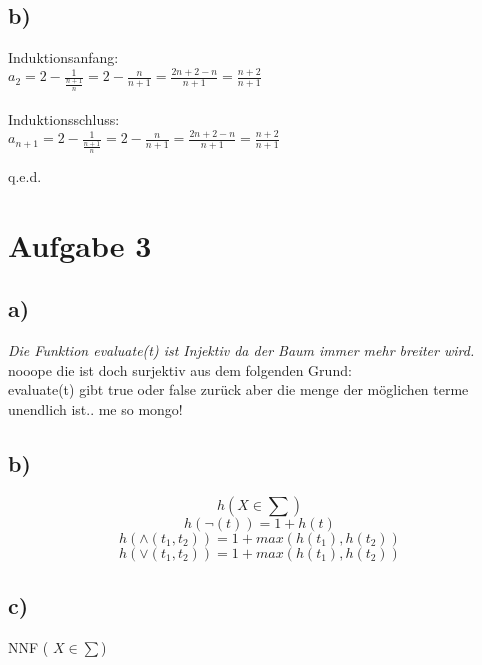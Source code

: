 \documentclass[12pt,a4paper]{article}
\begin{document}
\subsection*{b)}
Induktionsanfang: \\
$ a_2 = 2- \frac{1}{\frac{n+1}{n}} = 2-\frac{n}{n+1} = \frac{2n+2-n}{n+1} = \frac{n+2}{n+1}$\\\\
Induktionsschluss:\\
$ a_{n+1} = 2 - \frac{1}{\frac{n+1}{n}} = 2 - \frac{n}{n+1} = \frac{2n+2-n}{n+1} = \frac{n+2}{n+1}$
\begin{flushright} q.e.d. \end{flushright}
\section*{Aufgabe 3}
\subsection*{a)}
\textit{Die Funktion evaluate(t) ist Injektiv da der Baum immer mehr breiter wird.}
nooope die ist doch surjektiv aus dem folgenden Grund: \\
evaluate(t) gibt true oder false zurück aber die menge der möglichen terme unendlich ist.. me so mongo!
\subsection*{b)}
$$
 h( X \in \sum) $$ $$
 h( \neg (t)) = 1 + h(t) $$ $$
 h(\wedge (t_1,t_2)) = 1 + max( h(t_1),h(t_2) )$$ $$
 h(\vee (t_1,t_2)) = 1 + max( h(t_1),h(t_2) )$$ $$
$$
\subsection*{c)}
NNF ( $ X \in \sum$)
\end{document}
